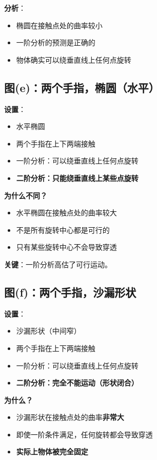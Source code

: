 \documentclass[12pt,a4paper]{article}
\begin{document}
\textbf{分析}：
\begin{itemize}
\item 椭圆在接触点处的曲率较小
\item 一阶分析的预测是正确的
\item 物体确实可以绕垂直线上任何点旋转
\end{itemize}

\subsection{图(e)：两个手指，椭圆（水平）}

\textbf{设置}：
\begin{itemize}
\item 水平椭圆
\item 两个手指在上下两端接触
\item 一阶分析：可以绕垂直线上任何点旋转
\item \textbf{二阶分析：只能绕垂直线上某些点旋转}
\end{itemize}

\textbf{为什么不同？}
\begin{itemize}
\item 水平椭圆在接触点处的曲率较大
\item 不是所有旋转中心都是可行的
\item 只有某些旋转中心不会导致穿透
\end{itemize}

\textbf{关键}：一阶分析高估了可行运动。

\subsection{图(f)：两个手指，沙漏形状}

\textbf{设置}：
\begin{itemize}
\item 沙漏形状（中间窄）
\item 两个手指在上下两端接触
\item 一阶分析：可以绕垂直线上任何点旋转
\item \textbf{二阶分析：完全不能运动（形状闭合）}
\end{itemize}

\textbf{为什么？}
\begin{itemize}
\item 沙漏形状在接触点处的曲率\textbf{非常大}
\item 即使一阶条件满足，任何旋转都会导致穿透
\item \textbf{实际上物体被完全固定}
\end{itemize}
\end{document}

